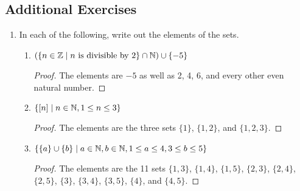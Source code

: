 \documentclass[../main.tex]{subfiles}
\begin{document}
\subsection*{Additional Exercises}
\begin{enumerate}[ref={\thechapter.\arabic*}]
    \item \label{axr:1.1}In each of the following, write out the elements of the sets.
    \begin{enumerate}[label={\alph*)},ref={\theenumi\alph*}]
        \item \label{axr:1.1a}$(\{n\in\mathbb{Z}\mid n\text{ is divisible by }2\}\cap\mathbb{N})\cup\{-5\}$
        \begin{proof}
            The elements are $-5$ as well as 2, 4, 6, and every other even natural number.
        \end{proof}
        \item \label{axr:1.1c}$\{[n]\mid n\in\mathbb{N},1\leq n\leq 3\}$
        \begin{proof}
            The elements are the three sets $\{1\}$, $\{1,2\}$, and $\{1,2,3\}$.
        \end{proof}
        \setcounter{enumii}{10}
        \item \label{axr:1.1k}$\{\{a\}\cup\{b\}\mid a\in\mathbb{N},b\in\mathbb{N},1\leq a\leq 4,3\leq b\leq 5\}$
        \begin{proof}
            The elements are the 11 sets $\{1,3\}$, $\{1,4\}$, $\{1,5\}$, $\{2,3\}$, $\{2,4\}$, $\{2,5\}$, $\{3\}$, $\{3,4\}$, $\{3,5\}$, $\{4\}$, and $\{4,5\}$.
        \end{proof}
    \end{enumerate}
\end{enumerate}
\end{document}
